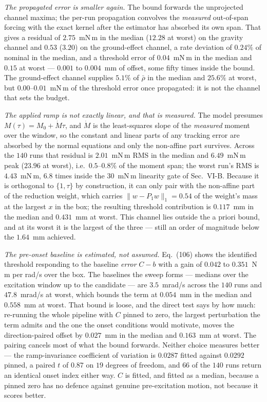 \emph{The propagated error is smaller again.} The bound forwards the
unprojected channel maxima; the per-run propagation convolves the
\emph{measured} out-of-span forcing with the exact kernel after the
estimator has absorbed its own span. That gives a residual of
$2.75$~mN\,m in the median ($12.28$ at worst) on the gravity channel
and $0.53$ ($3.20$) on the ground-effect channel, a rate deviation of
$0.24\%$ of nominal in the median, and a threshold error of
$0.04$~mN\,m in the median and $0.15$ at worst --- $0.001$ to
$0.004$~mm of offset, some fifty times inside the bound. The
ground-effect channel supplies $5.1\%$ of $\bar\rho$ in the median and
$25.6\%$ at worst, but $0.00$--$0.01$~mN\,m of the threshold error once
propagated: it is not the channel that sets the budget.

\emph{The applied ramp is not exactly linear, and that is measured.}
The model presumes $M(\tau) = M_0 + \dot M\tau$, and $\dot M$ is the
least-squares slope of the \emph{measured} moment over the window, so
the constant and linear parts of any tracking error are absorbed by the
normal equations and only the non-affine part survives. Across the
$140$ runs that residual is $2.01$~mN\,m RMS in the median and
$6.49$~mN\,m peak ($23.96$ at worst), i.e.\ $0.5$--$0.8\%$ of the
moment span; the worst run's RMS is $4.43$~mN\,m, $6.8$ times inside
the $30$~mN\,m linearity gate of Sec.~VI-B. Because it is orthogonal to $\{1,\tau\}$ by construction, it
can only pair with the non-affine part of the reduction weight, which
carries $\|w - P_1w\|_1 = 0.54$ of the weight's mass at the largest $x$
in the box; the resulting threshold contribution is $0.117$~mm in the
median and $0.431$~mm at worst. This channel lies outside the a priori
bound, and at its worst it is the largest of the three --- still an
order of magnitude below the $1.64$~mm achieved.

\emph{The pre-onset baseline is estimated, not assumed.} Eq.~(106)
shows the identified threshold responding to the baseline \emph{error}
$C - b$ with a gain of $0.042$ to $0.351$~N\,m per rad/s over the box.
The baselines the sweep forms --- medians over the excitation window up
to the candidate --- are $3.5$~mrad/s across the $140$ runs and
$47.8$~mrad/s at worst, which bounds the term at $0.054$~mm in the
median and $0.558$~mm at worst. That bound is loose, and the direct
test says by how much: re-running the whole pipeline with $C$ pinned to
zero, the largest perturbation the term admits and the one the onset
conditions would motivate, moves the direction-paired offset by
$0.027$~mm in the median and $0.163$~mm at worst. The pairing cancels
most of what the bound forwards. Neither choice measures better --- the
ramp-invariance coefficient of variation is $0.0287$ fitted against
$0.0292$ pinned, a paired $t$ of $0.87$ on $19$ degrees of freedom, and
$66$ of the $140$ runs return an identical onset index either way. $C$
is fitted, and fitted as a median, because a pinned zero has no defence
against genuine pre-excitation motion, not because it scores better.


